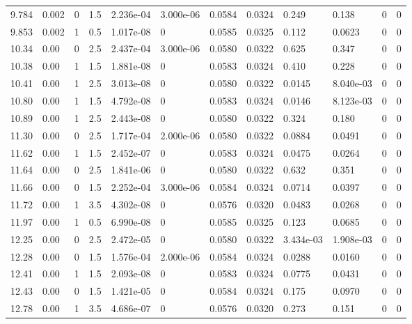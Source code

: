 \documentclass[preview]{standalone}
\begin{document}
{{{\begin{tabular}{L{1.2cm}C{1.2cm} C{0.3cm}C{0.5cm} C{1.4cm}C{1.4cm} C{1.4cm}C{1.4cm} C{1.6cm}C{1.6cm} C{1.6cm}C{1.6cm}}
  9.784  &  0.002  & 0     & 1.5 &  2.236e-04  & 3.000e-06  &  0.0584&   0.0324& 0.249 & 0.138   &  0 & 0  \\ 
  9.853  &  0.002  & 1     & 0.5 &  1.017e-08  & 0  &  0.0585&   0.0325& 0.112 & 0.0623   &  0 & 0  \\ 
  10.34  &  0.00  & 0     & 2.5 &  2.437e-04  & 3.000e-06  &  0.0580&   0.0322& 0.625 & 0.347   &  0 & 0  \\ 
  10.38  &  0.00  & 1     & 1.5 &  1.881e-08  & 0  &  0.0583&   0.0324& 0.410 & 0.228   &  0 & 0  \\ 
  10.41  &  0.00  & 1     & 2.5 &  3.013e-08  & 0  &  0.0580&   0.0322& 0.0145 & 8.040e-03   &  0 & 0  \\ 
  10.80  &  0.00  & 1     & 1.5 &  4.792e-08  & 0  &  0.0583&   0.0324& 0.0146 & 8.123e-03   &  0 & 0  \\ 
  10.89  &  0.00  & 1     & 2.5 &  2.443e-08  & 0  &  0.0580&   0.0322& 0.324 & 0.180   &  0 & 0  \\ 
  11.30  &  0.00  & 0     & 2.5 &  1.717e-04  & 2.000e-06  &  0.0580&   0.0322& 0.0884 & 0.0491   &  0 & 0  \\ 
  11.62  &  0.00  & 1     & 1.5 &  2.452e-07  & 0  &  0.0583&   0.0324& 0.0475 & 0.0264   &  0 & 0  \\ 
  11.64  &  0.00  & 0     & 2.5 &  1.841e-06  & 0  &  0.0580&   0.0322& 0.632 & 0.351   &  0 & 0  \\ 
  11.66  &  0.00  & 0     & 1.5 &  2.252e-04  & 3.000e-06  &  0.0584&   0.0324& 0.0714 & 0.0397   &  0 & 0  \\ 
  11.72  &  0.00  & 1     & 3.5 &  4.302e-08  & 0  &  0.0576&   0.0320& 0.0483 & 0.0268   &  0 & 0  \\ 
  11.97  &  0.00  & 1     & 0.5 &  6.990e-08  & 0  &  0.0585&   0.0325& 0.123 & 0.0685   &  0 & 0  \\ 
  12.25  &  0.00  & 0     & 2.5 &  2.472e-05  & 0  &  0.0580&   0.0322& 3.434e-03 & 1.908e-03   &  0 & 0  \\ 
  12.28  &  0.00  & 0     & 1.5 &  1.576e-04  & 2.000e-06  &  0.0584&   0.0324& 0.0288 & 0.0160   &  0 & 0  \\ 
  12.41  &  0.00  & 1     & 1.5 &  2.093e-08  & 0  &  0.0583&   0.0324& 0.0775 & 0.0431   &  0 & 0  \\ 
  12.43  &  0.00  & 0     & 1.5 &  1.421e-05  & 0  &  0.0584&   0.0324& 0.175 & 0.0970   &  0 & 0  \\ 
  12.78  &  0.00  & 1     & 3.5 &  4.686e-07  & 0  &  0.0576&   0.0320& 0.273 & 0.151   &  0 & 0  \\ 

\end{tabular}}}}
\end{document}
